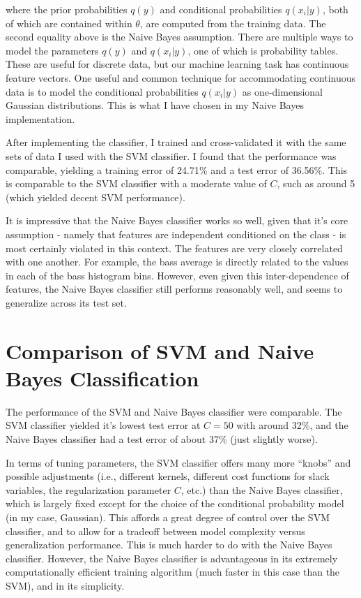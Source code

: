 \documentclass[aps,twocolumn,secnumarabic,balancelastpage,amsmath,amssymb,nofootinbib]{revtex4-1}
\begin{document}
where the prior probabilities $q(y)$ and conditional probabilities $q(x_i | y)$, both of which are contained within $\theta$, are computed from the training data. The second equality above is the Naive Bayes assumption. There are multiple ways to model the parameters $q(y)$ and $q(x_i | y)$, one of which is probability tables. These are useful for discrete data, but our machine learning task has continuous feature vectors. One useful and common technique for accommodating continuous data is to model the conditional probabilities $q(x_i | y)$ as one-dimensional Gaussian distributions. This is what I have chosen in my Naive Bayes implementation.

After implementing the classifier, I trained and cross-validated it with the same sets of data I used with the SVM classifier. I found that the performance was comparable, yielding a training error of 24.71\% and a test error of 36.56\%. This is comparable to the SVM classifier with a moderate value of $C$, such as around 5 (which yielded decent SVM performance). 

It is impressive that the Naive Bayes classifier works so well, given that it's core assumption - namely that features are independent conditioned on the class - is most certainly violated in this context. The features are very closely correlated with one another. For example, the bass average is directly related to the values in each of the bass histogram bins. However, even given this inter-dependence of features, the Naive Bayes classifier still performs reasonably well, and seems to generalize across its test set.


\section{Comparison of SVM and Naive Bayes Classification}
The performance of the SVM and Naive Bayes classifier were comparable. The SVM classifier yielded it's lowest test error at $C = 50$ with around 32\%, and the Naive Bayes classifier had a test error of about 37\% (just slightly worse).

In terms of tuning parameters, the SVM classifier offers many more ``knobs'' and possible adjustments (i.e., different kernels, different cost functions for slack variables, the regularization parameter $C$, etc.) than the Naive Bayes classifier, which is largely fixed except for the choice of the conditional probability model (in my case, Gaussian). This affords a great degree of control over the SVM classifier, and to allow for a tradeoff between model complexity versus generalization performance. This is much harder to do with the Naive Bayes classifier. However, the Naive Bayes classifier is advantageous in its extremely computationally efficient training algorithm (much faster in this case than the SVM), and in its simplicity.
\end{document}
